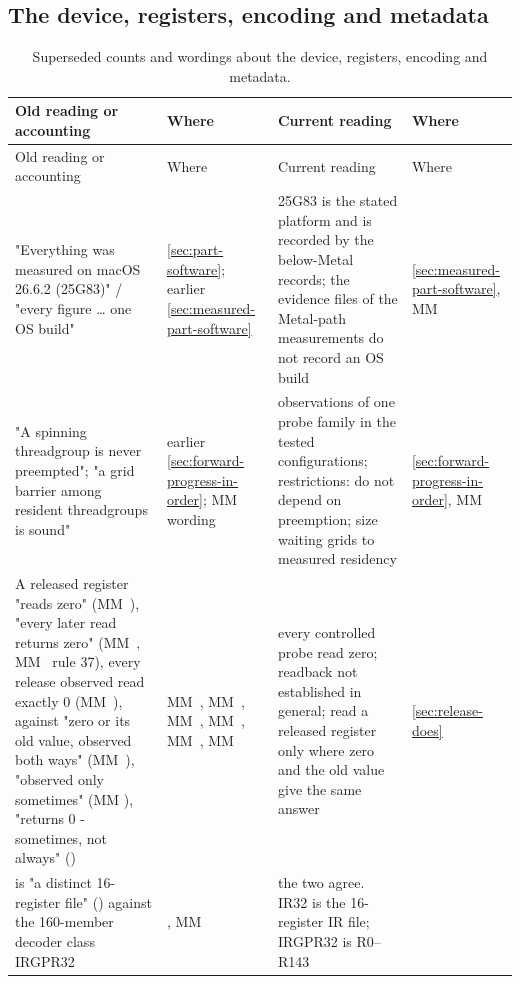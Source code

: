 \subsection*{The device, registers, encoding and metadata}\label{sub:device-registers-encoding}

\begin{xltabular}{\linewidth}{@{}>{\hsize}X>{\hsize}X>{\hsize}X>{\hsize}X@{}}
\caption{Superseded counts and wordings about the device, registers, encoding and metadata.}\label{tab:acct-device-encoding}\\
\toprule
Old reading or accounting & Where & Current reading & Where \\
\midrule
\endfirsthead
{}
\toprule
Old reading or accounting & Where & Current reading & Where \\
\midrule
\endhead
"Everything was measured on macOS 26.6.2 (25G83)" / "every figure \dots{}
one OS build" & \cref{sec:part-software}; earlier 
\cref{sec:measured-part-software} & 25G83 is the stated platform and is recorded by the below-Metal records;
the evidence files of the Metal-path measurements do not record an OS
build & \cref{sec:measured-part-software}, MM~ \\
"A spinning threadgroup is never preempted"; "a grid barrier among
resident threadgroups is sound" & earlier \cref{sec:forward-progress-in-order}; MM~
wording & observations of one probe family in the tested configurations;
restrictions: do not depend on preemption; size waiting grids to
measured residency & \cref{sec:forward-progress-in-order}, MM~ \\
A released register "reads zero" (MM~), "every later read
returns zero" (MM~, MM~ rule 37), every release observed
read exactly 0 (MM~), against "zero or its old value, observed
both ways" (MM~), "observed only sometimes" (MM
), "returns 0 - sometimes, not always"
() & MM~, MM~, MM~, MM~, MM~, MM~ & every controlled probe read zero; readback not established in general;
read a released register only where zero and the old value give the same
answer & \cref{sec:release-does} \\
 is "a distinct 16-register file"
() against the 160-member decoder
class IRGPR32 & , MM~ & the two agree. IR32 is the 16-register IR file; IRGPR32 is R0–R143

\end{xltabular}
